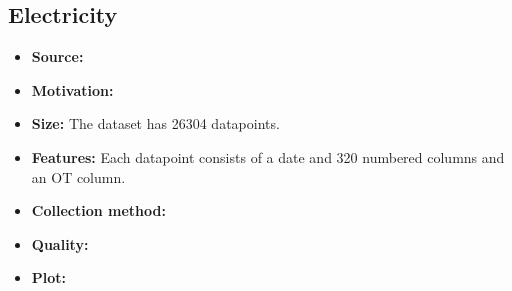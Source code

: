 \subsection{Electricity}
\begin{itemize}
	\item \textbf{Source:}
	\item \textbf{Motivation:}
	\item \textbf{Size:} The dataset has 26304 datapoints.
	\item \textbf{Features:} Each datapoint consists of a date and 320 numbered columns and an OT column.
	\item \textbf{Collection method:}
	\item \textbf{Quality:}
	\item \textbf{Plot:}
\end{itemize}
